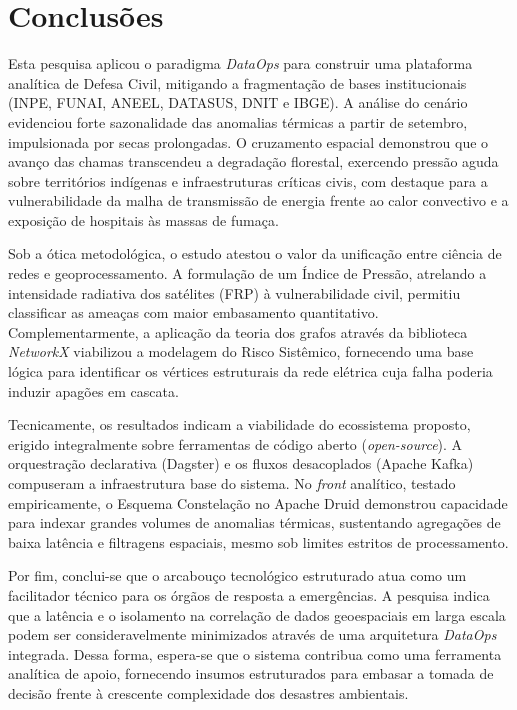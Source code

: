 \section{Conclusões}

Esta pesquisa aplicou o paradigma \textit{DataOps} para construir uma plataforma analítica de Defesa Civil, mitigando a fragmentação de bases institucionais (INPE, FUNAI, ANEEL, DATASUS, DNIT e IBGE). A análise do cenário evidenciou forte sazonalidade das anomalias térmicas a partir de setembro, impulsionada por secas prolongadas. O cruzamento espacial demonstrou que o avanço das chamas transcendeu a degradação florestal, exercendo pressão aguda sobre territórios indígenas e infraestruturas críticas civis, com destaque para a vulnerabilidade da malha de transmissão de energia frente ao calor convectivo e a exposição de hospitais às massas de fumaça.

Sob a ótica metodológica, o estudo atestou o valor da unificação entre ciência de redes e geoprocessamento. A formulação de um Índice de Pressão, atrelando a intensidade radiativa dos satélites (FRP) à vulnerabilidade civil, permitiu classificar as ameaças com maior embasamento quantitativo. Complementarmente, a aplicação da teoria dos grafos através da biblioteca \textit{NetworkX} viabilizou a modelagem do Risco Sistêmico, fornecendo uma base lógica para identificar os vértices estruturais da rede elétrica cuja falha poderia induzir apagões em cascata.

Tecnicamente, os resultados indicam a viabilidade do ecossistema proposto, erigido integralmente sobre ferramentas de código aberto (\textit{open-source}). A orquestração declarativa (Dagster) e os fluxos desacoplados (Apache Kafka) compuseram a infraestrutura base do sistema. No \textit{front} analítico, testado empiricamente, o Esquema Constelação no Apache Druid demonstrou capacidade para indexar grandes volumes de anomalias térmicas, sustentando agregações de baixa latência e filtragens espaciais, mesmo sob limites estritos de processamento.

Por fim, conclui-se que o arcabouço tecnológico estruturado atua como um facilitador técnico para os órgãos de resposta a emergências. A pesquisa indica que a latência e o isolamento na correlação de dados geoespaciais em larga escala podem ser consideravelmente minimizados através de uma arquitetura \textit{DataOps} integrada. Dessa forma, espera-se que o sistema contribua como uma ferramenta analítica de apoio, fornecendo insumos estruturados para embasar a tomada de decisão frente à crescente complexidade dos desastres ambientais.
